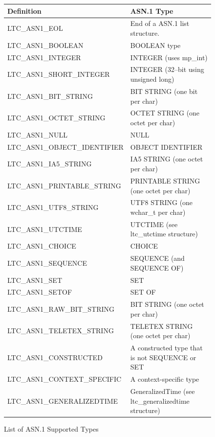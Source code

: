 \documentclass[synpaper]{book}
\begin{document}
\begin{figure}[h]
\begin{center}
\begin{small}
\begin{tabular}{|l|l|}
\hline \textbf{Definition}           & \textbf{ASN.1 Type} \\
\hline LTC\_ASN1\_EOL                & End of a ASN.1 list structure. \\
\hline LTC\_ASN1\_BOOLEAN            & BOOLEAN type \\
\hline LTC\_ASN1\_INTEGER            & INTEGER (uses mp\_int) \\
\hline LTC\_ASN1\_SHORT\_INTEGER     & INTEGER (32--bit using unsigned long) \\
\hline LTC\_ASN1\_BIT\_STRING        & BIT STRING (one bit per char) \\
\hline LTC\_ASN1\_OCTET\_STRING      & OCTET STRING (one octet per char) \\
\hline LTC\_ASN1\_NULL               & NULL \\
\hline LTC\_ASN1\_OBJECT\_IDENTIFIER & OBJECT IDENTIFIER  \\
\hline LTC\_ASN1\_IA5\_STRING        & IA5 STRING (one octet per char) \\
\hline LTC\_ASN1\_PRINTABLE\_STRING  & PRINTABLE STRING (one octet per char) \\
\hline LTC\_ASN1\_UTF8\_STRING       & UTF8 STRING (one wchar\_t per char) \\
\hline LTC\_ASN1\_UTCTIME            & UTCTIME (see ltc\_utctime structure) \\
\hline LTC\_ASN1\_CHOICE             & CHOICE \\
\hline LTC\_ASN1\_SEQUENCE           & SEQUENCE (and SEQUENCE OF) \\
\hline LTC\_ASN1\_SET                & SET \\
\hline LTC\_ASN1\_SETOF              & SET OF \\
\hline LTC\_ASN1\_RAW\_BIT\_STRING   & BIT STRING (one octet per char) \\
\hline LTC\_ASN1\_TELETEX\_STRING    & TELETEX STRING (one octet per char) \\
\hline LTC\_ASN1\_CONSTRUCTED        & A constructed type that is not SEQUENCE or SET \\
\hline LTC\_ASN1\_CONTEXT\_SPECIFIC  & A context-specific type \\
\hline LTC\_ASN1\_GENERALIZEDTIME    & GeneralizedTime (see ltc\_generalizedtime structure) \\
\hline
\end{tabular}
\caption{List of ASN.1 Supported Types}
\end{small}
\end{center}
\end{figure}
\end{document}
